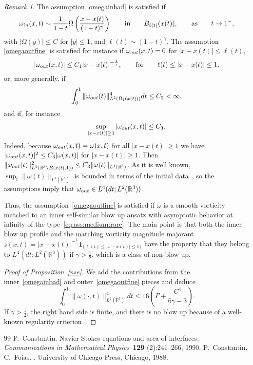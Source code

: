 \documentclass[10pt,a4paper]{amsart}
\theoremstyle{plain}
\theoremstyle{remark}
\newtheorem{remark}[theorem]{Remark}
\newcommand{\la}{\label}
\newcommand{\fr}{\frac}
\newcommand{\be}{\begin{equation}}
\newcommand{\ee}{\end{equation}}
\newcommand{\Rr}{{\mathbb R}}
\begin{document}
\begin{remark}
The assumption \eqref{omegainbad} is satisfied if
\[
\omega_{\rm in}(x,t) \sim
\frac{1}{{1}-t}\Omega\left(\fr{x-x(t)}{({1}-t)^{\gamma}}\right) 
\qquad\mbox{in} \qquad B_{\ell(t)}(x(t)), 
\qquad\mbox{as} \qquad t \to 1^-,
\] 
with $|\Omega(y)| \le  C$ for $|y|\le 1$, {and $\ell(t) \sim (1-t)^\gamma$}. 
The assumption \eqref{omegaoutfine} is satisfied {for instance} if 
$\omega_{\rm out}(x,t) = 0$ for $|x-x(t)|\le \ell(t)$,
\[
|\omega_{\rm out}(x,t)| \le C_1 |x-x(t)|^{-\fr{1}{\gamma}}, 
\qquad \mbox{for} \qquad \ell(t) \leq |x-x(t)|\leq 1,
\]
or, more generally, if
\be
\int_0^1\|\omega_{\rm out}(t)\|^4_{L^2(B_1(x(t)))}dt 
\leq C_2 <\infty,
\la{outin}
\ee
and if, for instance
\[
\sup_{|x - x(t)|\ge 1}|\omega_{\rm out}(x,t)| \le C_3.
\] 
Indeed, because $\omega_{\rm out}(x,t) = \omega(x,t)$ for all $|x-x(t)|\ge 1$ we have  $|\omega_{\rm out}(x,t)|^2 \le C_3|\omega(x,t)|$ for 
$|x-x(t)|\ge 1$. Then $\|\omega_{\rm out}(t)\|_{L^2(\Rr^3\setminus B(x(t),1))}^2 \le C_3\|\omega(t)\|_{L^1(\Rr^3)}$. As it is well known, $\sup_t \|\omega (t)\|_{L^1(\Rr^3)}$ is bounded in terms of the initial data~\cite{ConstantinArea}, so the assumptions imply that $\omega_{\rm out}\in L^4(dt; L^2(\Rr^3))$. 

Thus, the assumption~\eqref{omegaoutfine}  is satisfied if $\omega$ is a smooth vorticity matched to an inner self-similar blow up ansatz with asymptotic behavior at infinity of the type~\eqref{eq:ass:medium:rare}. The main point is that both the inner blow up profile and the matching vorticity magnitude majorant  $z(x,t) = |x-x(t)|^{-\fr{1}{\gamma}}\mathbf 1_{\{\ell(t)\le |x-x(t)| \le 1\}}$ have the property  that  they belong to $ L^4(dt; L^2(\Rr^3))$ if $\gamma>\fr{1}{2}$, which is a class of non-blow up.
\end{remark}


\begin{proof}[{Proof of Proposition~\ref{nse}}]
We add the contributions {from the inner~\eqref{omegainbad} and outer~\eqref{omegaoutfine} pieces} and deduce
\begin{equation*}
\int_0^{{1}} \|\omega (\cdot,t)\|_{L^2(\Rr^3)}^4dt \le 16\left(\Gamma + \fr{C^4}{6\gamma-3}\right).
\end{equation*}
If $\gamma>\fr{1}{2}$, the right hand side is finite, and there is no blow up because of a well-known regularity criterion~\cite{CFbook}.
\end{proof}

\begin{thebibliography}{99}
 P.~Constantin. \newblock Navier-Stokes equations and area of interfaces. \newblock \textit{Communications in Mathematical Physics}~\textbf{129} (2):241--266, 1990.
 P.~Constantin, C.~Foias. . \newblock University of Chicago Press, Chicago, 1988.
\end{thebibliography}
\end{document}
